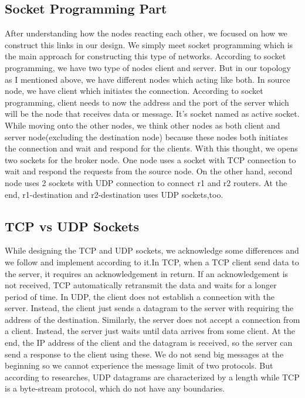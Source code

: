 \documentclass[conference]{IEEEtran}
\begin{document}
\subsection{Socket Programming Part}

After understanding how the nodes reacting each other, we focused on how we construct this links in our design. We simply meet socket programming which is the main approach for constructing this type of networks. According to socket programming, we have two type of nodes client and server. But in our topology as I mentioned above, we have different nodes which acting like both. In source node, we have client which initiates the connection. According to socket programming, client needs to now the address and the port of the server which will be the node that receives data or message. It's socket named as active socket. While moving onto the other nodes, we think other nodes as both client and server node(excluding the destination node) because these nodes both initiates the connection and wait  and respond for the clients. With this thought, we opens two sockets for the broker node. One node uses a socket with TCP connection to wait and respond the requests from the source node. On the other hand, second node uses 2 sockets with UDP connection to connect r1 and r2 routers. At the end, r1-destination and r2-destination uses UDP sockets,too.

\subsection{TCP vs UDP Sockets}
While designing the TCP and UDP sockets, we acknowledge some differences and we follow and implement according to it.In TCP, when a TCP client send data to the server, it requires an acknowledgement in return. If an acknowledgement is not received, TCP automatically retransmit the data and waits for a longer period of time. In UDP, the client does not establish a connection with the server. Instead, the client just sends a datagram to the server with requiring the address of the destination. Similarly, the server does not accept a connection from a client. Instead, the server just waits until data arrives from some client. At the end, the IP address of the client and the datagram is received, so the server can send a response to the client using these. We do not send big messages at the beginning so we cannot experience the message limit of two protocols. But according to researches, UDP datagrams are characterized by a length while TCP is a byte-stream protocol, which do not have any boundaries.
\end{document}
